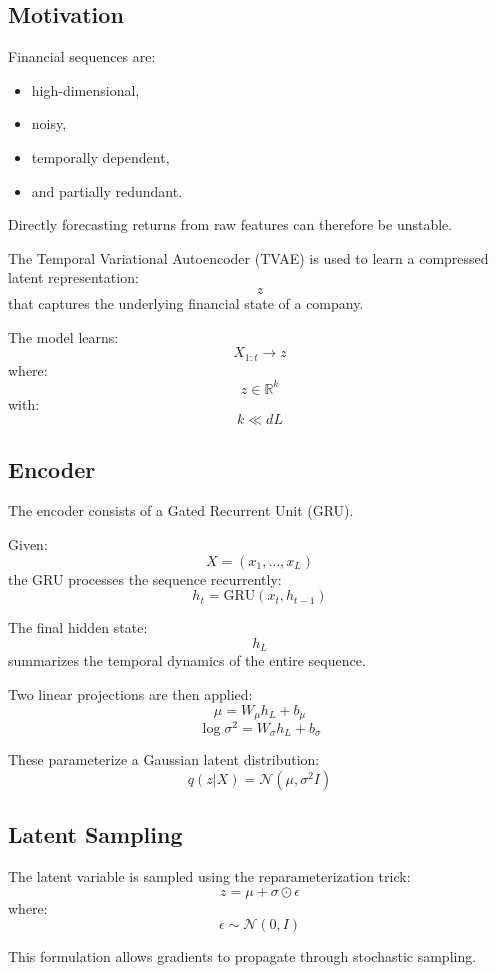 \documentclass[11pt]{article}
\begin{document}
\subsection{Motivation}

Financial sequences are:
\begin{itemize}
    \item high-dimensional,
    \item noisy,
    \item temporally dependent,
    \item and partially redundant.
\end{itemize}

Directly forecasting returns from raw features can therefore be unstable.

The Temporal Variational Autoencoder (TVAE) is used to learn a compressed latent representation:
\[
z
\]
that captures the underlying financial state of a company.

The model learns:
\[
X_{1:t}
\rightarrow
z
\]
where:
\[
z \in \mathbb{R}^k
\]
with:
\[
k \ll dL
\]

\subsection{Encoder}

The encoder consists of a Gated Recurrent Unit (GRU).

Given:
\[
X
=
(x_1,\dots,x_L)
\]
the GRU processes the sequence recurrently:
\[
h_t
=
\text{GRU}(x_t,h_{t-1})
\]

The final hidden state:
\[
h_L
\]
summarizes the temporal dynamics of the entire sequence.

Two linear projections are then applied:
\[
\mu = W_\mu h_L + b_\mu
\]
\[
\log \sigma^2
=
W_\sigma h_L + b_\sigma
\]

These parameterize a Gaussian latent distribution:
\[
q(z|X)
=
\mathcal{N}(\mu,\sigma^2I)
\]

\subsection{Latent Sampling}

The latent variable is sampled using the reparameterization trick:
\[
z
=
\mu
+
\sigma \odot \epsilon
\]
where:
\[
\epsilon
\sim
\mathcal{N}(0,I)
\]

This formulation allows gradients to propagate through stochastic sampling.
\end{document}

